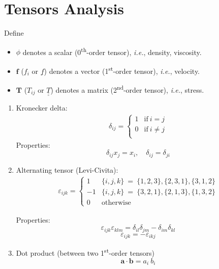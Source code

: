 \documentclass[a4paper]{article}
\begin{document}
\section{Tensors Analysis}
Define 
\begin{itemize}
    \item $\phi$ denotes a scalar (0\textsuperscript{th}-order tensor), \textit{i.e.}, density, viscosity.
    \item $\mathbf{f}$ ($f_i$ or $\underline{f}$) denotes a vector (1\textsuperscript{st}-order tensor), \textit{i.e.}, velocity.
    \item $\mathbf{T}$ ($T_{ij}$ or $\underline{\underline{T}}$) denotes a matrix (2\textsuperscript{nd}-order tensor), \textit{i.e.}, stress.
\end{itemize}


\begin{multicols}{2}
\begin{enumerate}

    \item Kronecker delta: 
    \begin{align*}
    \delta_{ij} = 
        \begin{cases}
            1 & \text{if} \ i=j \\
            0 & \text{if} \ i\neq j \\
        \end{cases}
    \end{align*}
    Properties:
    \[\delta_{ij}x_{j} = x_{i}, \quad \delta_{ij}=\delta_{ji}\]
    
    \item Alternating tensor (Levi-Civita):
    \begin{align*}
    \varepsilon_{ijk} = 
        \begin{cases}
            1 & \{i,j,k\} \ =\ \{1,2,3\}, \{2,3,1\}, \{3,1,2\} \\
            -1 & \{i,j,k\} \ =\ \{3,2,1\}, \{2,1,3\}, \{1,3,2\} \\
            0 & \text{otherwise}
        \end{cases}
    \end{align*}
    
    Properties:
    \[\varepsilon_{ijk}\varepsilon_{klm} = \delta_{il}\delta_{jm}-\delta_{im}\delta_{kl}\]
    \[\varepsilon_{ijk} = -\varepsilon_{ikj}\]
    
    \item Dot product (between two 1\textsuperscript{st}-order tensors)
    \[\mathbf{a} \cdot \mathbf{b} = a_{i} \ b_{i}\]
    

\end{enumerate}
\end{multicols}
\end{document}
